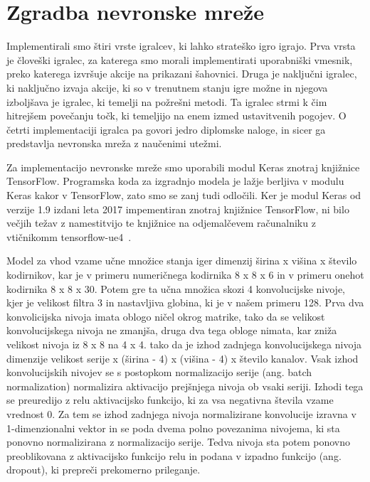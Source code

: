 \documentclass[a4paper, 12pt]{book}
\begin{document}
\section{Zgradba nevronske mreže}

Implementirali smo štiri vrste igralcev, ki lahko strateško igro igrajo.
Prva vrsta je človeški igralec, za katerega smo morali implementirati uporabniški vmesnik, preko katerega izvršuje akcije na prikazani šahovnici.
Druga je naključni igralec, ki naključno izvaja akcije, ki so v trenutnem stanju igre možne in njegova izboljšava je igralec, ki temelji na požrešni metodi.
Ta igralec strmi k čim hitrejšem povečanju točk, ki temeljijo na enem izmed ustavitvenih pogojev.
O četrti implementaciji igralca pa govori jedro diplomske naloge, in sicer ga predstavlja nevronska mreža z naučenimi utežmi.



Za implementacijo nevronske mreže smo uporabili modul Keras znotraj knjižnice TensorFlow.
Programska koda za izgradnjo modela je lažje berljiva v modulu Keras kakor v TensorFlow, zato smo se zanj tudi odločili.
Ker je modul Keras od verzije 1.9 izdani leta 2017 impementiran znotraj knjižnice TensorFlow, ni bilo večjih težav z namestitvijo te knjižnice na odjemalčevem računalniku z vtičnikomm tensorflow-ue4~\cite{ue4tf}.

Model za vhod vzame učne množice stanja iger dimenzij širina x višina x število kodirnikov, kar je v primeru numeričnega kodirnika 8 x 8 x 6 in v primeru onehot kodirnika 8 x 8 x 30.
Potem gre ta učna množica skozi 4 konvolucijske nivoje, kjer je velikost filtra 3 in nastavljiva globina, ki je v našem primeru 128.
Prva dva konvolicijska nivoja imata oblogo ničel okrog matrike, tako da se velikost konvolucijskega nivoja ne zmanjša, druga dva tega obloge nimata, kar zniža velikost nivoja iz 8 x 8 na 4 x 4.
tako da je izhod zadnjega konvolucijskega nivoja dimenzije velikost serije  x (širina - 4) x (višina - 4) x število kanalov.
Vsak izhod konvolucijskih nivojev se s postopkom normalizacijo serije (ang. batch normalization) normalizira aktivacijo prejšnjega nivoja ob vsaki seriji.
Izhodi tega se preuredijo z relu aktivacijsko funkcijo, ki za vsa negativna števila vzame vrednost 0.
Za tem se izhod zadnjega nivoja normalizirane konvolucije izravna v 1-dimenzionalni vektor in se poda dvema polno povezanima nivojema, ki sta ponovno normalizirana z normalizacijo serije.
Tedva nivoja sta potem ponovno preoblikovana z aktivacijsko funkcijo relu in podana v izpadno funkcijo (ang. dropout), ki prepreči prekomerno prileganje.
\end{document}

